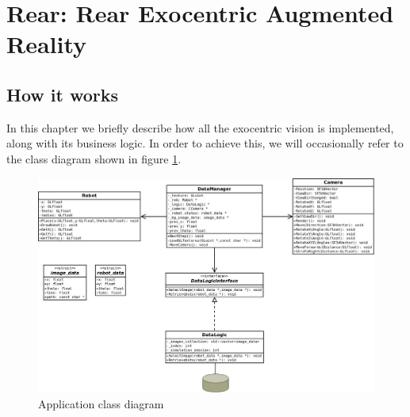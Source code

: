 \section{Rear: Rear Exocentric Augmented Reality}
\label{sec:rear}

\subsection{How it works}
In this chapter we briefly describe how all the exocentric vision
is implemented, along with its business logic. In order to achieve
this, we will occasionally refer to the class diagram shown in figure
\ref{fig:class_diagram}.
%
\begin{figure}[!h]
  \begin{center}
    \includegraphics[width=400pt]{img/class_diagram.jpeg}  %
    \caption{Application class diagram}
    \label{fig:class_diagram}
  \end{center}
\end{figure}
%



